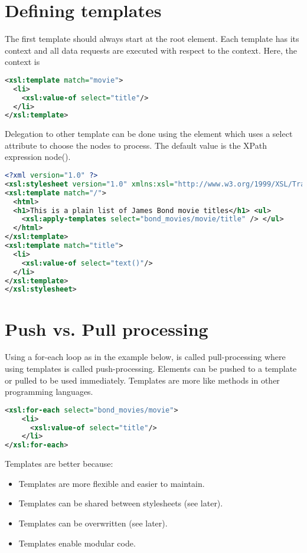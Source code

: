 \section{Defining templates}
The first template should always start at the root element.
Each template has its context and all data requests are executed with respect to the context. Here, the context is 
\begin{lstlisting}[language=XML]
<xsl:template match="movie">
  <li>
    <xsl:value-of select="title"/>
  </li>
</xsl:template>
\end{lstlisting}
Delegation to other template can be done using the  element which uses a select attribute
 to choose the nodes to process. The default value is the XPath expression node(). \\
 \begin{lstlisting}[language=XML]
<?xml version="1.0" ?>
<xsl:stylesheet version="1.0" xmlns:xsl="http://www.w3.org/1999/XSL/Transform">
<xsl:template match="/">
  <html>
  <h1>This is a plain list of James Bond movie titles</h1> <ul>
    <xsl:apply-templates select="bond_movies/movie/title" /> </ul>
  </html>
</xsl:template>
<xsl:template match="title">
  <li>
    <xsl:value-of select="text()"/>
  </li>
</xsl:template>
</xsl:stylesheet>
\end{lstlisting}
\section{Push vs. Pull processing}
Using a for-each loop as in the example below, is called pull-processing where using templates is called push-processing.
Elements can be pushed to a template or pulled to be used immediately. Templates are more like methods in other programming languages.
\begin{lstlisting}[language=XML]
<xsl:for-each select="bond_movies/movie">
    <li>
      <xsl:value-of select="title"/>
    </li>
</xsl:for-each>
\end{lstlisting}
Templates are better because:
\begin{itemize}
  \item Templates are more flexible and easier to maintain.
  \item Templates can be shared between stylesheets (see later).
  \item Templates can be overwritten (see later).
  \item Templates enable modular code.
\end{itemize}

